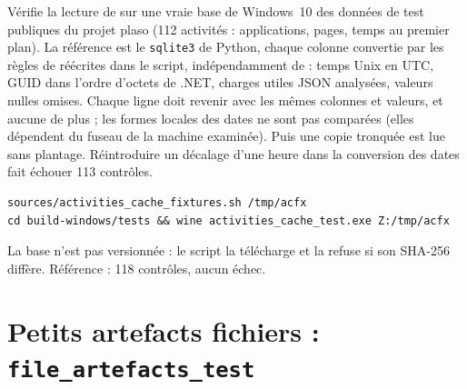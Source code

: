 \documentclass[11pt,a4paper,oneside]{report}
\begin{document}
Vérifie la lecture de  sur une vraie base de
Windows~10 des données de test publiques du projet plaso (112 activités :
applications, pages, temps au premier plan). La référence est le
\texttt{sqlite3} de Python, chaque colonne convertie par les règles de
 réécrites dans le script, indépendamment de
\wac{} : temps Unix en UTC, GUID dans l'ordre d'octets de .NET, charges
utiles JSON analysées, valeurs nulles omises. Chaque ligne doit revenir avec
les mêmes colonnes et valeurs, et aucune de plus ; les formes locales des
dates ne sont pas comparées (elles dépendent du fuseau de la machine
examinée). Puis une copie tronquée est lue sans plantage. Réintroduire un
décalage d'une heure dans la conversion des dates fait échouer 113 contrôles.

\begin{lstlisting}
sources/activities_cache_fixtures.sh /tmp/acfx
cd build-windows/tests && wine activities_cache_test.exe Z:/tmp/acfx
\end{lstlisting}

La base n'est pas versionnée : le script la télécharge et la refuse si son
SHA-256 diffère. Référence : 118 contrôles, aucun échec.

\section{Petits artefacts fichiers : \texttt{file\_artefacts\_test}}
\end{document}
